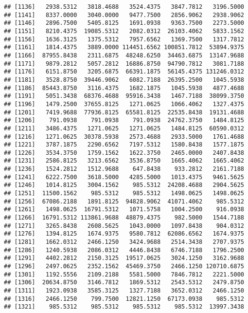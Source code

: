 \documentclass[]{article}
\begin{document}
\begin{verbatim}
## [1136]   2938.5312   3818.4688   3524.4375   3847.7812   3196.5000
## [1141]   8337.0000   3040.0000   9477.7500   2856.9062   2938.9062
## [1146]   2896.7500   5405.8125   1691.0938   9363.7500   2273.5000
## [1151]   8210.4375  19085.5312   2082.0312  26103.4062   5833.1562
## [1156]   1636.3125   1375.5312   7957.6562   1369.7500   1317.7812
## [1161]   1814.4375   3889.0000 114451.6562 100851.7812  53894.9375
## [1166]  87955.8438   2311.6875  48248.6250  34463.6875  13147.9688
## [1171]   9879.2812   5057.2812  16886.8750  94790.7812   3081.7188
## [1176]   6151.8750   3205.6875  66391.1875  56145.4375 131246.0312
## [1181]   3528.8750  39446.9062   6082.7188  26395.2500   1045.5938
## [1186]  85443.8750   3116.4375   1682.1875   1045.5938   4877.4688
## [1191]   5051.3438  68376.4688  95916.3438   1467.7188  38099.3750
## [1196]   1479.2500  37655.8125   1271.0625   1066.4062   1327.4375
## [1201]   7419.9688  77936.8125  65581.8125  22535.8438  19131.4688
## [1206]    791.0938    791.0938    791.0938  24762.3750   1484.8125
## [1211]   3486.4375   1271.0625   1271.0625   1484.8125  60590.0312
## [1216]   1271.0625  30378.5938   2573.4688   2933.5000   1761.4688
## [1221]   3787.1875   2290.6562   7197.5312   1580.8438   1577.1875
## [1226]   3534.3750   1759.1562   1622.3750   2465.0000   2407.8438
## [1231]   2586.8125   3213.6562   3536.8750   1665.4062   1665.4062
## [1236]   1524.2812   1512.9688    647.8438    933.2812   2161.7188
## [1241]   6222.7500   3618.5000   4285.5000   1013.4375   9461.5625
## [1246]   1014.8125   3004.1562    985.5312  24208.4688   2904.5625
## [1251]  11500.1562    985.5312    985.5312   1498.0625   1498.0625
## [1256]  67086.2188   1891.8125  94828.9062  41071.4062    985.5312
## [1261]   1498.0625  16791.5312   1071.5758   1004.2500    916.0938
## [1266]  16791.5312 113861.9688  48879.4375    982.5000   1544.7188
## [1271]   3265.8438   2608.5625   1043.0000   1097.8438    904.0312
## [1276]   1394.8125   1674.9375   9580.7812  62086.6562   1674.9375
## [1281]   1662.0312   2466.1250   3424.9688   2514.3438   2707.9375
## [1286]   1240.5938   2086.0312   4446.8438   6746.7188   1796.2500
## [1291]   4402.2812   2150.3125  19517.0625   3024.1250   3162.9688
## [1296]   2497.0625   2352.1562  45469.3750   2466.1250 120710.6875
## [1301]   1192.5556   2109.2188   5581.5000   7846.7812   2221.5000
## [1306]  20634.8750   3146.7812   1869.5312   2543.5312   2479.8750
## [1311]   1923.0938   3585.3125   1327.7188   3652.0312   2466.1250
## [1316]   2466.1250    799.7500  12821.1250  67173.0938    985.5312
## [1321]    985.5312    985.5312    985.5312    985.5312  13997.3438

\end{verbatim}
\end{document}
